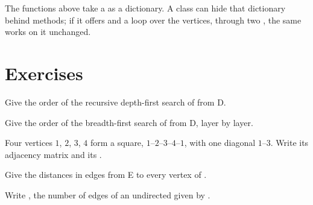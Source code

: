 The functions above take a  as a dictionary. A class can hide that dictionary behind methods; if it offers
 and a loop over the vertices, through two , the same  works on it unchanged.

%
\label{lst:g12:graph-algorithms:graph-class}

\label{lst:g12:graph-algorithms:use-graph}

\label{out:g12:graph-algorithms:use-graph}

\section{Exercises}\label{sec:g12:graph-algorithms:exercises}

\begin{exercise}[$\star$]\label{exo:g12:graph-algorithms:1}
Give the order of the recursive depth-first search of  from D.
\end{exercise}

\begin{exercise}[$\star$]\label{exo:g12:graph-algorithms:2}
Give the order of the breadth-first search of  from D, layer by layer.
\end{exercise}

\begin{exercise}[$\star$]\label{exo:g12:graph-algorithms:3}
Four vertices $1$, $2$, $3$, $4$ form a square, $1$--$2$--$3$--$4$--$1$, with one diagonal $1$--$3$. Write its
adjacency matrix and its .
\end{exercise}

\begin{exercise}[$\star$]\label{exo:g12:graph-algorithms:4}
Give the distances in edges from E to every vertex of .
\end{exercise}

\begin{exercise}[$\star$]\label{exo:g12:graph-algorithms:5}
Write , the number of edges of an undirected  given by .
\end{exercise}


